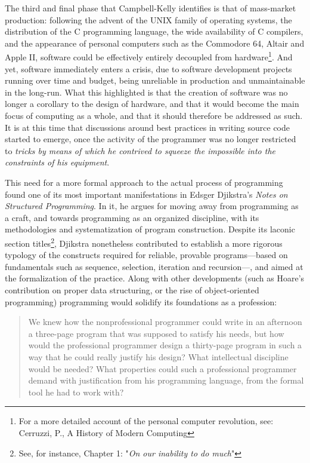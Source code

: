 The third and final phase that Campbell-Kelly identifies is that of mass-market production: following the advent of the UNIX family of operating systems, the distribution of the C programming language, the wide availability of C compilers, and the appearance of personal computers such as the Commodore 64, Altair and Apple II, software could be effectively entirely decoupled from hardware\footnote{For a more detailed account of the personal computer revolution, see: Cerruzzi, P., A History of Modern Computing\cite{ceruzzi_history_2003}}. And yet, software immediately enters a crisis, due to software development projects running over time and budget, being unreliable in production and unmaintainable in the long-run. What this highlighted is that the creation of software was no longer a corollary to the design of hardware, and that it would become the main focus of computing as a whole\cite{ceruzzi_history_2003}, and that it should therefore be addressed as such. It is at this time that discussions around best practices in writing source code started to emerge, once the activity of the programmer was no longer restricted to \emph{tricks by means of which he contrived to squeeze the impossible into the constraints of his equipment}\cite{dijkstra_humble_2007}.

This need for a more formal approach to the actual process of programming found one of its most important manifestations in Edsger Djikstra's \emph{Notes on Structured Programming}\cite{dijkstra_chapter_1972}. In it, he argues for moving away from programming as a craft, and towards programming as an organized discipline, with its methodologies and systematization of program construction. Despite its laconic section titles\footnote{See, for instance, Chapter 1: "\emph{On our inability to do much}"}, Djikstra nonetheless contributed to establish a more rigorous typology of the constructs required for reliable, provable programs—based on fundamentals such as sequence, selection, iteration and recursion—, and aimed at the formalization of the practice. Along with other developments (such as Hoare's contribution on proper data structuring\cite{hoare_chapter_1972}, or the rise of object-oriented programming) programming would solidify its foundations as a profession:

\begin{quote}
  We knew how the nonprofessional programmer could write in an afternoon a three-page program that was supposed to satisfy his needs, but how would the professional programmer design a thirty-page program in such a way that he could really justify his design? What intellectual discipline would be needed? What properties could such a professional programmer demand with justification from his programming language, from the formal tool he had to work with? \cite{dijkstra_chapter_1972}
\end{quote}

